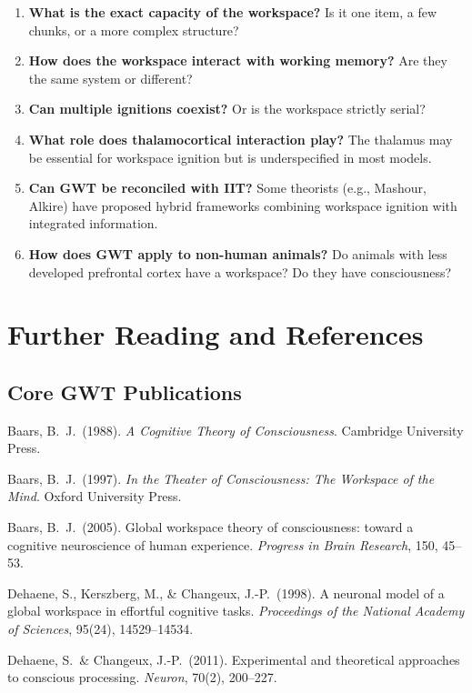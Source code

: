 \documentclass[11pt,a4paper]{report}
\begin{document}
\begin{enumerate}[leftmargin=2em]
  \item \textbf{What is the exact capacity of the workspace?} Is it one item, a few chunks, or a more complex structure?
  \item \textbf{How does the workspace interact with working memory?} Are they the same system or different?
  \item \textbf{Can multiple ignitions coexist?} Or is the workspace strictly serial?
  \item \textbf{What role does thalamocortical interaction play?} The thalamus may be essential for workspace ignition but is underspecified in most models.
  \item \textbf{Can GWT be reconciled with IIT?} Some theorists (e.g., Mashour, Alkire) have proposed hybrid frameworks combining workspace ignition with integrated information.
  \item \textbf{How does GWT apply to non-human animals?} Do animals with less developed prefrontal cortex have a workspace? Do they have consciousness?
\end{enumerate}


\chapter{Further Reading and References}

\section*{Core GWT Publications}
\begin{enumerate}[label={[\arabic*]}, leftmargin=2.5em]
  \item Baars, B.\ J.\ (1988). \textit{A Cognitive Theory of Consciousness}. Cambridge University Press.
  \item Baars, B.\ J.\ (1997). \textit{In the Theater of Consciousness: The Workspace of the Mind}. Oxford University Press.
  \item Baars, B.\ J.\ (2005). Global workspace theory of consciousness: toward a cognitive neuroscience of human experience. \textit{Progress in Brain Research}, 150, 45--53.
  \item Dehaene, S., Kerszberg, M., \& Changeux, J.-P.\ (1998). A neuronal model of a global workspace in effortful cognitive tasks. \textit{Proceedings of the National Academy of Sciences}, 95(24), 14529--14534.
  \item Dehaene, S.\ \& Changeux, J.-P.\ (2011). Experimental and theoretical approaches to conscious processing. \textit{Neuron}, 70(2), 200--227.
\end{enumerate}
\end{document}

